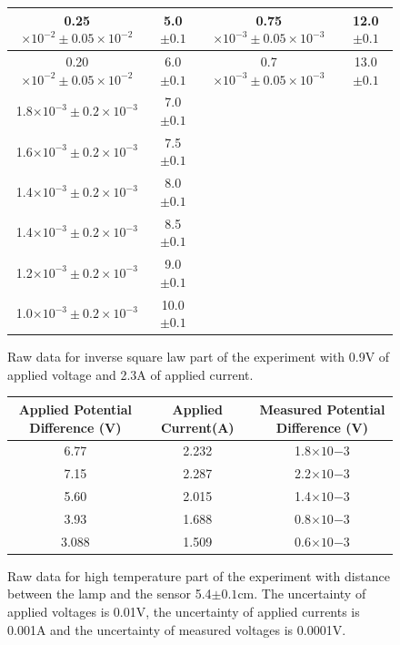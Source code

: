 \documentclass[11pt,a4paper]{article}
\begin{document}
{\begin{center}
\begin{figure} [H]
\begin{tabular}{|c |c||c|c|}
			\hline 
			0.25$\times10^{-2} \pm 0.05\times10^{-2}$ & 5.0$\pm0.1$ & 0.75$\times10^{-3} \pm 0.05\times10^{-3}$ &12.0$\pm0.1$\\
			\hline 
			0.20$\times10^{-2} \pm 0.05\times10^{-2}$ & 6.0$\pm0.1$ & 0.7$\times10^{-3} \pm 0.05\times10^{-3}$ & 13.0$\pm0.1$\\
			\hline 
			1.8$\times10^{-3} \pm 0.2\times10^{-3}$ & 7.0$\pm0.1$ &  & \\
			\hline 
			1.6$\times10^{-3} \pm 0.2\times10^{-3}$ & 7.5$\pm0.1$ &  &\\
			\hline 
			1.4$\times10^{-3} \pm 0.2\times10^{-3}$ & 8.0$\pm0.1$ &   & \\
			\hline
			1.4$\times10^{-3} \pm 0.2\times10^{-3}$&8.5$\pm0.1$& &\\
			\hline
			1.2$\times10^{-3} \pm 0.2\times10^{-3}$&9.0$\pm0.1$& &\\
			\hline
			1.0$\times10^{-3} \pm 0.2\times10^{-3}$&10.0$\pm0.1$& &\\
			\hline
		\end{tabular}
		\caption{Raw data for inverse square law part of the experiment with 0.9V of applied voltage and 2.3A of applied current.}
	\end{figure}
\end{center}
\begin{center}
	\begin{figure} [H] 
		\begin{tabular}{|c |c|c|} \hline
			Applied Potential Difference (V)& Applied Current(A) & Measured Potential Difference (V)\\ [0.5ex] 
			\hline
			6.77 & 2.232 & 1.8$\times10{-3}$\\
			\hline
			7.15 & 2.287 & 2.2$\times10{-3}$\\
			\hline
			5.60 & 2.015 & 1.4$\times10{-3}$\\
			\hline
			3.93 & 1.688 & 0.8$\times10{-3}$\\
			\hline
			3.088 & 1.509 & 0.6$\times10{-3}$\\
			\hline
		\end{tabular}
	\caption{Raw data for high temperature part of the experiment with distance between the lamp and the sensor 5.4$\pm0.1$cm. The uncertainty of applied voltages is 0.01V, the uncertainty of applied currents is 0.001A and the uncertainty of measured voltages is 0.0001V.}
\end{figure}
\end{center}
\begin{center}
	\begin{figure} [H] 

\end{figure}
\end{center}}
\end{document}

